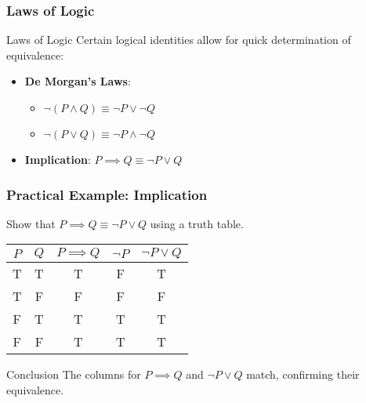 \documentclass[aspectratio=169]{beamer}
\begin{document}
\begin{frame}[fragile]
    \frametitle{Laws of Logic}
    \begin{block}{Laws of Logic}
        Certain logical identities allow for quick determination of equivalence:
        \begin{itemize}
            \item \textbf{De Morgan's Laws}:
            \begin{itemize}
                \item \( \neg (P \land Q) \equiv \neg P \lor \neg Q \)
                \item \( \neg (P \lor Q) \equiv \neg P \land \neg Q \)
            \end{itemize}
            \item \textbf{Implication}: \( P \implies Q \equiv \neg P \lor Q \)
        \end{itemize}
    \end{block}
\end{frame}

\begin{frame}[fragile]
    \frametitle{Practical Example: Implication}
    Show that \( P \implies Q \equiv \neg P \lor Q \) using a truth table.

    \begin{center}
        \begin{tabular}{|c|c|c|c|c|}
            \hline
            \( P \) & \( Q \) & \( P \implies Q \) & \( \neg P \) & \( \neg P \lor Q \) \\ 
            \hline
            T       & T       & T                   & F             & T                    \\ 
            T       & F       & F                   & F             & F                    \\ 
            F       & T       & T                   & T             & T                    \\ 
            F       & F       & T                   & T             & T                    \\ 
            \hline
        \end{tabular}
    \end{center}
    \begin{block}{Conclusion}
        The columns for \( P \implies Q \) and \( \neg P \lor Q \) match, confirming their equivalence.
    \end{block}
\end{frame}
\end{document}
